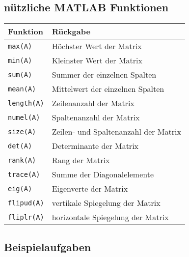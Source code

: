         \subsection{nützliche MATLAB Funktionen}
        \renewcommand{\arraystretch}{1.4}
        \begin{tabularx}{\textwidth}{|X|X|}
            \hline
            \textbf{Funktion} & \textbf{Rückgabe} \\
            \hline
            \texttt{max(A)} & Höchster Wert der Matrix\\
            \hline
            \texttt{min(A)} & Kleinster Wert der Matrix \\
            \hline
            \texttt{sum(A)} & Summer der einzelnen Spalten \\
            \hline
            \texttt{mean(A)} & Mittelwert der einzelnen Spalten \\
            \hline
            \texttt{length(A)} & Zeilenanzahl der Matrix \\
            \hline
            \texttt{numel(A)} & Spaltenanzahl der Matrix \\
            \hline
            \texttt{size(A)} & Zeilen- und Spaltenanzahl der Matrix \\
            \hline
            \texttt{det(A)} & Determinante der Matrix \\
            \hline
            \texttt{rank(A)} & Rang der Matrix \\
            \hline
            \texttt{trace(A)} & Summe der Diagonalelemente \\
            \hline
            \texttt{eig(A)} & Eigenverte der Matrix \\
            \hline
            \texttt{flipud(A)} & vertikale Spiegelung der Matrix \\
            \hline
            \texttt{fliplr(A)} & horizontale Spiegelung der Matrix \\
            \hline
        \end{tabularx}
        \subsection{Beispielaufgaben}